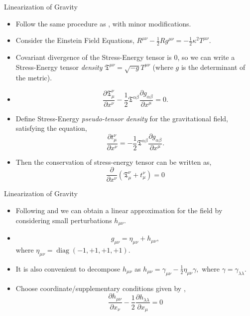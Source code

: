 \documentclass[12pt,aspectratio=1610]{beamer}
\newcommand{\mink}{\eta_{\mu\nu}}
\newcommand{\munu}{\mu\nu}
\DeclareMathOperator{\diag}{diag}
\begin{document}
\begin{frame}{Linearization of Gravity}
    \begin{itemize}
        \item Follow the same procedure as \citet{Gupta_1952}, with minor modifications.
        \item Consider the Einstein Field Equations, $R^{\munu} - \frac{1}{2}Rg^{\munu} = -\frac{1}{2}\kappa^2T^{\munu}$.
        \item Covariant divergence of the Stress-Energy tensor is $0$, so we can write a Stress-Energy tensor \textit{density} $\mathfrak{T}^{\munu} = \sqrt{-g}T^{\munu}$ (where $g$ is the determinant of the metric).
        \item \begin{equation*}
    \frac{\partial\mathfrak{T}^{\nu}_{\mu}}{\partial x^{\nu}} - \frac{1}{2}\mathfrak{T}^{\alpha\beta}\frac{\partial g_{\alpha\beta}}{\partial x^{\mu}} = 0.
    \end{equation*}
    \item Define Stress-Energy \textit{pseudo-tensor density} \citep{Gupta_1952} for the gravitational field, satisfying the equation,
\begin{equation*}
    \frac{\partial t^{\nu}_{\mu}}{\partial x^{\nu}} = - \frac{1}{2}\mathfrak{T}^{\alpha\beta}\frac{\partial g_{\alpha\beta}}{\partial x^{\mu}}.
\end{equation*}
    \item Then the conservation of stress-energy tensor can be written as,
    \begin{equation*}
    \frac{\partial}{\partial x^{\nu}}(\mathfrak{T}^{\nu}_{\mu} + t^{\nu}_{\mu}) = 0
    \label{eq: PseudoStEnergyDen1}
\end{equation*}
    \end{itemize}
\end{frame}
\begin{frame}{Linearization of Gravity}
    \begin{itemize}
        \item Following \citet{Gupta_1952} and \citet{EinsteinGravWave} we can obtain a linear approximation for the field by considering small perturbations $h_{\munu}$.
        \item $$g_{\munu} = \mink + h_{\munu},$$ where $\mink = \diag(-1, +1, +1, +1)$.
        \item It is also convenient to decompose $h_{\munu}$ as $h_{\munu} = \gamma_{\munu} - \frac{1}{2}\mink\gamma,$ where $\gamma = \gamma_{\lambda\lambda}$.
        \item Choose coordinate/supplementary conditions given by \citep{Gupta_1952},
        \begin{equation*}
            \frac{\partial h_{\munu}}{\partial x_{\nu}} -  \frac{1}{2}\frac{\partial h_{\lambda\lambda}}{\partial x_{\mu}} = 0
        \end{equation*}
    \end{itemize}
\end{frame}
\end{document}
